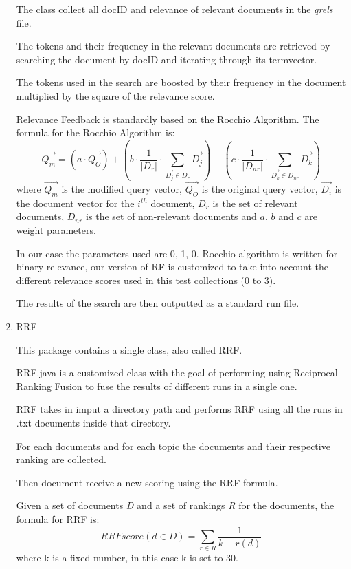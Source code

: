 \begin{enumerate}
        The class collect all docID and relevance of relevant documents in the \textit{qrels} file.
        
        The tokens and their frequency in the relevant documents are retrieved by searching the document by docID and iterating through its termvector.
        
        The tokens used in the search are boosted by their frequency in the document multiplied by the square of the relevance score.
        
        Relevance Feedback is standardly based on the Rocchio Algorithm.
        The formula for the Rocchio Algorithm is:
        $$
        \overrightarrow{Q_{m}}=
        \left(a\cdot\overrightarrow{Q_{O}}\right)+
        \left(b\cdot\frac{1}{|D_{r}|}\cdot\sum_{\overrightarrow{D_{j}}\in D_{r}}\overrightarrow{D_{j}}\right)-
        \left(c\cdot\frac{1}{|D_{nr}|}\cdot\sum_{\overrightarrow{D_{k}}\in D_{nr}}\overrightarrow{D_{k}}\right)
        $$
        where $\overrightarrow{Q_{m}}$ is the modified query vector, $\overrightarrow{Q_{O}}$ is the original query vector, $\overrightarrow{D_{i}}$ is the document vector for the $i^{th}$ document, $D_{r}$ is the set of relevant documents, $D_{nr}$ is the set of non-relevant documents and $a$, $b$ and $c$ are weight parameters.
        
        In our case the parameters used are 0, 1, 0.
        Rocchio algorithm is written for binary relevance, our version of RF is customized to take into account the different relevance scores used in this test collections (0 to 3).
        
        The results of the search are then outputted as a standard run file.
  \item RRF
  
      This package contains a single class, also called RRF.
        
        RRF.java is a customized class with the goal of performing using Reciprocal Ranking Fusion to fuse the results of different runs in a single one.
        
        RRF takes in imput a directory path and performs RRF using all the runs in .txt documents inside that directory.
        
        For each documents and for each topic the documents and their respective ranking are collected.
        
        Then document receive a new scoring using the RRF formula.
        
        Given a set of documents \textit{D} and a set of rankings \textit{R} for the documents, the formula for RRF is:
        $$RRFscore(d \in D)=\sum_{r \in R}^{}\frac{1}{k+r(d)}$$
        where k is a fixed number, in this case k is set to 30.
        

\end{enumerate}
